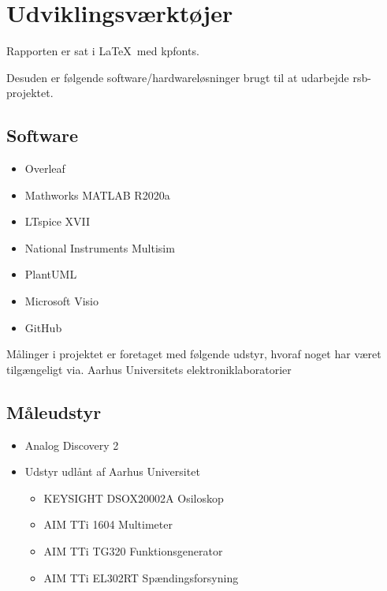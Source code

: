 \section{Udviklingsværktøjer}
Rapporten er sat i \LaTeX~med kpfonts.

Desuden er følgende software/hardwareløsninger brugt til at udarbejde \gls{rsb}-projektet.

\subsection{Software}
\begin{itemize}
    \item Overleaf
    \item Mathworks MATLAB R2020a
    \item LTspice XVII
    \item National Instruments Multisim
    \item PlantUML
    \item Microsoft Visio
    \item GitHub
\end{itemize}

Målinger i projektet er foretaget med følgende udstyr, hvoraf noget har været tilgængeligt via. Aarhus Universitets elektroniklaboratorier
\subsection{Måleudstyr}
\begin{itemize}
    \item Analog Discovery 2
    \item Udstyr udlånt af Aarhus Universitet
          \begin{itemize}
              \item KEYSIGHT DSOX20002A Osiloskop
              \item AIM TTi 1604 Multimeter
              \item AIM TTi TG320 Funktionsgenerator
              \item AIM TTi EL302RT Spændingsforsyning
          \end{itemize}
\end{itemize}
